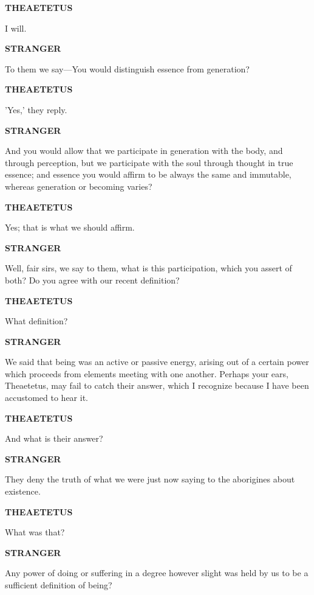 \documentclass[11pt,letter]{article}
\begin{document}
\par \textbf{THEAETETUS}
\par   I will.

\par \textbf{STRANGER}
\par   To them we say—You would distinguish essence from generation?

\par \textbf{THEAETETUS}
\par   'Yes,' they reply.

\par \textbf{STRANGER}
\par   And you would allow that we participate in generation with the body, and through perception, but we participate with the soul through thought in true essence; and essence you would affirm to be always the same and immutable, whereas generation or becoming varies?

\par \textbf{THEAETETUS}
\par   Yes; that is what we should affirm.

\par \textbf{STRANGER}
\par   Well, fair sirs, we say to them, what is this participation, which you assert of both? Do you agree with our recent definition?

\par \textbf{THEAETETUS}
\par   What definition?

\par \textbf{STRANGER}
\par   We said that being was an active or passive energy, arising out of a certain power which proceeds from elements meeting with one another. Perhaps your ears, Theaetetus, may fail to catch their answer, which I recognize because I have been accustomed to hear it.

\par \textbf{THEAETETUS}
\par   And what is their answer?

\par \textbf{STRANGER}
\par   They deny the truth of what we were just now saying to the aborigines about existence.

\par \textbf{THEAETETUS}
\par   What was that?

\par \textbf{STRANGER}
\par   Any power of doing or suffering in a degree however slight was held by us to be a sufficient definition of being?
\end{document}
